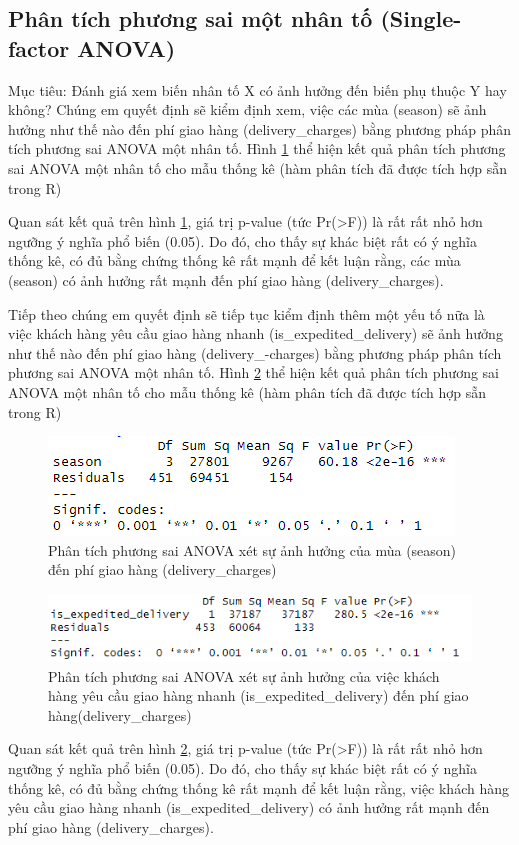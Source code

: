 \subsection{Phân tích phương sai một nhân tố (Single-factor ANOVA)}
Mục tiêu: Đánh giá xem biến nhân tố X có ảnh hưởng đến biến phụ thuộc Y hay không?
Chúng em quyết định sẽ kiểm định xem, việc các mùa (season) sẽ ảnh hưởng như thế nào đến phí giao hàng (delivery\_charges) bằng
phương pháp phân tích phương sai ANOVA một nhân tố. Hình \ref{fig:5.1} thể hiện kết quả phân tích phương sai ANOVA một nhân tố cho mẫu thống kê (hàm phân tích đã được tích hợp sẵn trong R)

Quan sát kết quả trên hình \ref{fig:5.1}, giá trị p-value (tức Pr(>F)) là rất rất nhỏ hơn ngưỡng ý nghĩa phổ biến (0.05). Do đó, cho thấy sự
khác biệt rất có ý nghĩa thống kê, có đủ bằng chứng thống kê rất mạnh để kết luận rằng, các mùa (season) có ảnh hưởng rất mạnh đến phí giao hàng (delivery\_charges).

Tiếp theo chúng em quyết định sẽ tiếp tục kiểm định thêm một yếu tố nữa là việc khách hàng yêu cầu giao hàng nhanh (is\_expedited\_delivery) sẽ ảnh hưởng như thế nào đến phí giao hàng (delivery\_-charges) bằng phương pháp phân tích phương sai ANOVA một nhân tố. Hình \ref{fig:5.2} thể hiện kết quả phân tích phương sai ANOVA một nhân tố cho mẫu thống kê (hàm phân tích đã được tích hợp sẵn trong R)
\begin{figure}[!htbp]
    \centering
    \includegraphics[width=0.6\linewidth]{graphics/5.3.1.png}
    \caption{Phân tích phương sai ANOVA xét sự ảnh hưởng của mùa (season) đến phí giao hàng (delivery\_charges)}
    \label{fig:5.1}
\end{figure}

\begin{figure}[!htbp]
    \centering
    \includegraphics[width=0.7\linewidth]{graphics/5.3.2.png}
    \caption{Phân tích phương sai ANOVA xét sự ảnh hưởng của việc khách hàng yêu cầu giao hàng nhanh (is\_expedited\_delivery) đến phí giao hàng(delivery\_charges)}
    \label{fig:5.2}
\end{figure}

    Quan sát kết quả trên hình \ref{fig:5.2}, giá trị p-value (tức Pr(>F)) là rất rất nhỏ hơn ngưỡng ý nghĩa phổ biến (0.05). Do đó, cho thấy sự
khác biệt rất có ý nghĩa thống kê, có đủ bằng chứng thống kê rất mạnh để kết luận rằng, việc khách hàng yêu cầu giao hàng nhanh (is\_expedited\_delivery) có ảnh hưởng rất mạnh đến phí giao hàng (delivery\_charges).
